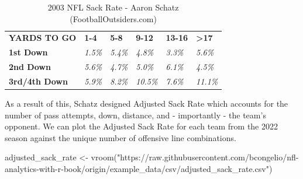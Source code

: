 \documentclass[
  letterpaper,
]{krantz}
\newenvironment{Shaded}{\begin{snugshade}}{\end{snugshade}}
\newcommand{\FunctionTok}[1]{\textcolor[rgb]{0.28,0.35,0.67}{#1}}
\newcommand{\NormalTok}[1]{\textcolor[rgb]{0.00,0.23,0.31}{#1}}
\newcommand{\OtherTok}[1]{\textcolor[rgb]{0.00,0.23,0.31}{#1}}
\newcommand{\StringTok}[1]{\textcolor[rgb]{0.13,0.47,0.30}{#1}}
\begin{document}
\begin{longtable}[]{@{}
  >{\centering\arraybackslash}p{}
  >{\raggedright\arraybackslash}p{}
  >{\raggedright\arraybackslash}p{}
  >{\raggedright\arraybackslash}p{}
  >{\raggedright\arraybackslash}p{}
  >{\raggedright\arraybackslash}p{}@{}}
\caption{2003 NFL Sack Rate - Aaron Schatz
(FootballOutsiders.com)}\tabularnewline
\toprule\noalign{}
\endfirsthead
\endhead
\bottomrule\noalign{}
\endlastfoot
\textbf{YARDS TO GO} & \textbf{1-4} & \textbf{5-8} & \textbf{9-12} &
\textbf{13-16} & \textbf{\textgreater17} \\
\textbf{1st Down} & \emph{1.5\%} & \emph{5.4\%} & \emph{4.8\%} &
\emph{3.3\%} & \emph{5.6\%} \\
\textbf{2nd Down} & \emph{5.6\%} & \emph{4.7\%} & \emph{5.0\%} &
\emph{6.1\%} & \emph{4.5\%} \\
\textbf{3rd/4th Down} & \emph{5.9\%} & \emph{8.2\%} & \emph{10.5\%} &
\emph{7.6\%} & \emph{11.1\%} \\
\end{longtable}

As a result of this, Schatz designed Adjusted Sack Rate which accounts
for the number of pass attempts, down, distance, and - importantly - the
team's opponent. We can plot the Adjusted Sack Rate for each team from
the 2022 season against the unique number of offensive line
combinations.

\begin{Shaded}
\begin{Highlighting}[]
\NormalTok{adjusted\_sack\_rate }\OtherTok{\textless{}{-}} 
  \FunctionTok{vroom}\NormalTok{(}\StringTok{"https://raw.githubusercontent.com/bcongelio/nfl{-}analytics{-}with{-}r{-}book/origin/example\_data/csv/adjusted\_sack\_rate.csv"}\NormalTok{)}
\end{Highlighting}
\end{Shaded}
\end{document}
